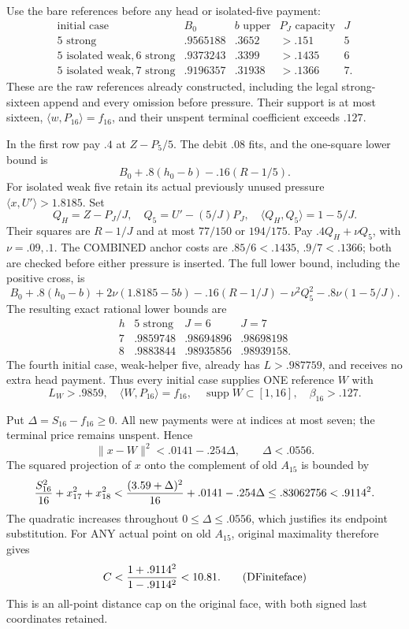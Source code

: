 \documentclass[11pt]{article}
\theoremstyle{definition}
\theoremstyle{remark}
\newcommand{\ip}[2]{\langle #1,#2\rangle}
\newcommand{\norm}[1]{\lVert #1\rVert}
\begin{document}
Use the bare references before any head or isolated-five payment:
\[
\begin{array}{c|c|c|c|c}
\text{initial case}&B_0&b\text{ upper}&P_J\text{ capacity}&J\\ \hline
5\text{ strong}&.9565188&.3652&>.151&5\\
5\text{ isolated weak},6\text{ strong}&.9373243&.3399&>.1435&6\\
5\text{ isolated weak},7\text{ strong}&.9196357&.31938&>.1366&7 .
\end{array}
\]
These are the raw references already constructed, including the
legal strong-sixteen append and every omission before pressure.
Their support is at most sixteen,
\(\ip w{P_{16}}=f_{16}\), and their unspent terminal coefficient
exceeds \(.127\).

In the first row pay \(.4\) at \(Z-P_5/5\).
The debit \(.08\) fits, and the one-square lower bound is
\[
 B_0+.8(h_0-b)-.16(R-1/5).
\]
For isolated weak five retain its actual previously unused pressure
\(\ip x{U'}>1.8185\).
Set
\[
 Q_H=Z-P_J/J,\quad Q_5=U'-(5/J)P_J,\quad
 \ip{Q_H}{Q_5}=1-5/J .
\]
Their squares are \(R-1/J\) and at most
\(77/150\) or \(194/175\).
Pay \(.4Q_H+\nu Q_5\), with \(\nu=.09,.1\).
The COMBINED anchor costs are
\(.85/6<.1435\), \(.9/7<.1366\);
both are checked before either pressure is inserted.
The full lower bound, including the positive cross, is
\[
 B_0+.8(h_0-b)+2\nu(1.8185-5b)
 -.16(R-1/J)-\nu^2Q_5^2-.8\nu(1-5/J).
\]
The resulting exact rational lower bounds are
\[
 \begin{array}{c|ccc}
 h&5\text{ strong}&J=6&J=7\\ \hline
 7&.9859748&.98694896&.98698198\\
 8&.9883844&.98935856&.98939158 .
 \end{array}
\]
The fourth initial case, weak-helper five, already has
\(L>.987759\), and receives no extra head payment.
Thus every initial case supplies ONE reference \(W\) with
\[
 L_W>.9859,\quad
 \ip W{P_{16}}=f_{16},\quad
 \operatorname{supp}W\subset[1,16],\quad \beta_{16}>.127.
\]

Put \(\Delta=S_{16}-f_{16}\ge0\).
All new payments were at indices at most seven; the terminal
price remains unspent.  Hence
\[
 \norm{x-W}^2<.0141-.254\Delta,\qquad
 \Delta<.0556 .
\]
The squared projection of \(x\) onto the complement of old \(A_{15}\)
is bounded by
\[
 {S_{16}^2\over16}+x_{17}^2+x_{18}^2
 <{(3.59+\Delta)^2\over16}+.0141-.254\Delta
 \le .83062756<.9114^2 .
\]
The quadratic increases throughout \(0\le\Delta\le.0556\),
which justifies its endpoint substitution.
For ANY actual point on old \(A_{15}\), original maximality
therefore gives
\[
              C<{1+.9114^2\over1-.9114^2}<10.81 .
\tag{DFiniteface}\label{eq:DFiniteface}
\]
This is an all-point distance cap on the original face, with both
signed last coordinates retained.
\end{document}
